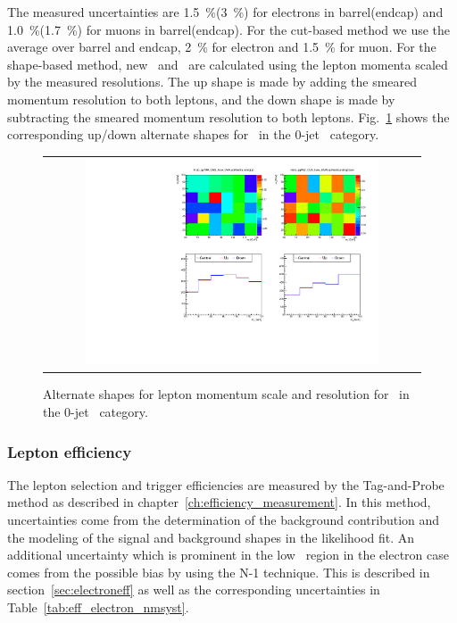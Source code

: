 The measured uncertainties are 1.5~\%(3~\%) for electrons in barrel(endcap)  
and 1.0~\%(1.7~\%) for muons in barrel(endcap). For the cut-based method 
we use the average over barrel and endcap, 2~\% for electron and 1.5~\% for muon. 
For the shape-based method, new \mT\ and \mll\ are calculated using the 
lepton momenta scaled by the measured resolutions.
The up shape is made by adding the smeared momentum resolution to both leptons,
and the down shape is made by subtracting the smeared momentum resolution to both leptons.
Fig.~\ref{fig:alter_lepres} shows the corresponding up/down alternate shapes 
for \qqww\ in the 0-jet \DF\ category. 
%
\begin{figure}[htp]
\centering
\begin{tabular}{c}
\includegraphics[width=0.8\textwidth]{figures/histo_qqWW_CMS_hww_MVALepResBounding_0j_zoom.pdf}
\end{tabular}
\caption{Alternate shapes for lepton momentum scale and resolution for \qqww\ in the 0-jet \DF\ category.}
\label{fig:alter_lepres}
\end{figure}


\subsubsection{Lepton efficiency} 

The lepton selection and trigger efficiencies are measured by the Tag-and-Probe method
as described in chapter~\ref{ch:efficiency_measurement}. In this method, uncertainties come from 
the determination of the background contribution and the modeling of the signal 
and background shapes in the likelihood fit. An additional uncertainty which is 
prominent in the low \pt\ region in the electron case 
comes from the possible bias by using the N-1 technique. 
This is described in section~\ref{sec:electroneff} as well as the corresponding 
uncertainties in Table~\ref{tab:eff_electron_nmsyst}.

